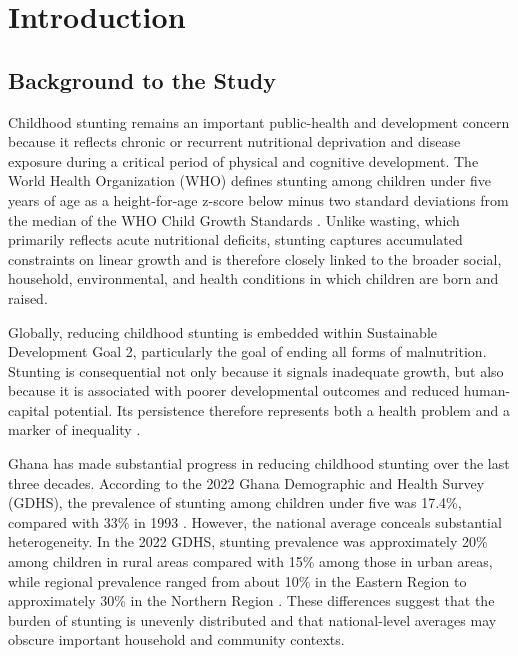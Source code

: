 \chapter{Introduction}
\label{chap:introduction}

\section{Background to the Study}

Childhood stunting remains an important public-health and development concern because it reflects chronic or recurrent nutritional deprivation and disease exposure during a critical period of physical and cognitive development. The World Health Organization (WHO) defines stunting among children under five years of age as a height-for-age z-score below minus two standard deviations from the median of the WHO Child Growth Standards \cite{WHOStunting2026}. Unlike wasting, which primarily reflects acute nutritional deficits, stunting captures accumulated constraints on linear growth and is therefore closely linked to the broader social, household, environmental, and health conditions in which children are born and raised.

Globally, reducing childhood stunting is embedded within Sustainable Development Goal 2, particularly the goal of ending all forms of malnutrition. Stunting is consequential not only because it signals inadequate growth, but also because it is associated with poorer developmental outcomes and reduced human-capital potential. Its persistence therefore represents both a health problem and a marker of inequality \cite{WHOStunting2026}.

Ghana has made substantial progress in reducing childhood stunting over the last three decades. According to the 2022 Ghana Demographic and Health Survey (GDHS), the prevalence of stunting among children under five was 17.4\%, compared with 33\% in 1993 \cite{GSSICF2024}. However, the national average conceals substantial heterogeneity. In the 2022 GDHS, stunting prevalence was approximately 20\% among children in rural areas compared with 15\% among those in urban areas, while regional prevalence ranged from about 10\% in the Eastern Region to approximately 30\% in the Northern Region \cite{GSSICF2024}. These differences suggest that the burden of stunting is unevenly distributed and that national-level averages may obscure important household and community contexts.

